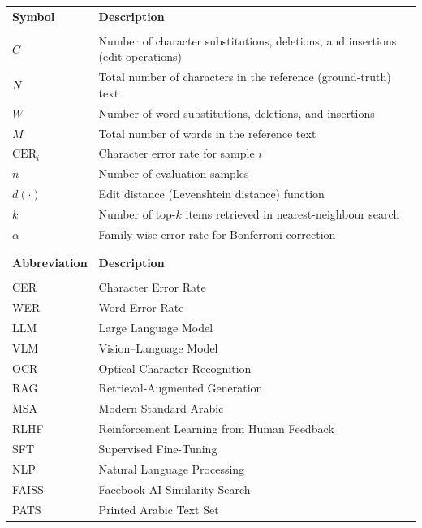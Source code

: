
    \begin{longtable}{ p{1.5in} p{3.75in} }
 {\large \textbf{Symbol}} & {\large \textbf{Description}}\\
                &\\
 $C$            & Number of character substitutions, deletions, and insertions (edit operations) \\
 $N$            & Total number of characters in the reference (ground-truth) text \\
 $W$            & Number of word substitutions, deletions, and insertions \\
 $M$            & Total number of words in the reference text \\
 $\text{CER}_i$ & Character error rate for sample $i$ \\
 $n$            & Number of evaluation samples \\
 $d(\cdot)$     & Edit distance (Levenshtein distance) function \\
 $k$            & Number of top-$k$ items retrieved in nearest-neighbour search \\
 $\alpha$       & Family-wise error rate for Bonferroni correction \\
                &\\
                &\\
 {\large \textbf{Abbreviation}} & {\large \textbf{Description}}\\
                &\\
 CER            & Character Error Rate \\
 WER            & Word Error Rate \\
 LLM            & Large Language Model \\
 VLM            & Vision--Language Model \\
 OCR            & Optical Character Recognition \\
 RAG            & Retrieval-Augmented Generation \\
 MSA            & Modern Standard Arabic \\
 RLHF           & Reinforcement Learning from Human Feedback \\
 SFT            & Supervised Fine-Tuning \\
 NLP            & Natural Language Processing \\
 FAISS          & Facebook AI Similarity Search \\
 PATS           & Printed Arabic Text Set \\

\end{longtable}
